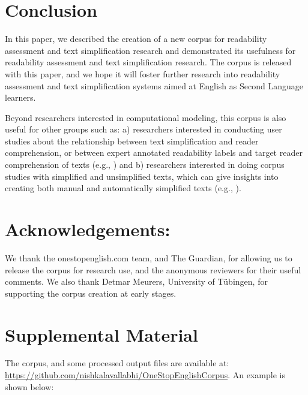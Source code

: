 \documentclass[11pt,a4paper]{article}
\begin{document}
\section{Conclusion}
\label{sec:concl}
In this paper, we described the creation of a new corpus for readability assessment and text simplification research and demonstrated its usefulness for readability assessment and text simplification research. The corpus is released with this paper, and we hope it will foster further research into readability assessment and text simplification systems aimed at English as Second Language learners. 

Beyond researchers interested in computational modeling, this corpus is also useful for other groups such as: a) researchers interested in conducting user studies about the relationship between text simplification and reader comprehension, or between expert annotated readability labels and target reader comprehension of texts (e.g., \citet{Vajjala.Meurers.ea-16}) and b) researchers interested in doing corpus studies with simplified and unsimplified texts, which can give insights into creating both manual and automatically simplified texts (e.g., \cite{Allen-09}).  

\section*{Acknowledgements:} We thank the onestopenglish.com team, and The Guardian, for allowing us to release the corpus for research use, and the anonymous reviewers for their useful comments. We also thank Detmar Meurers, University of T\"ubingen, for supporting the corpus creation at early stages. 


\appendix

\section{Supplemental Material}
\label{sec:supplemental}
The corpus, and some processed output files are available at: \url{https://github.com/nishkalavallabhi/OneStopEnglishCorpus}.  An example is shown below:
\end{document}
